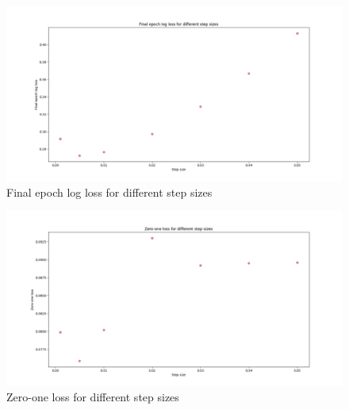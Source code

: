 \documentclass{exam}
\begin{document}
\begin{figure}[!ht]
    \centering
    \includegraphics[width=0.70\paperwidth]{images/plot3.png}
    \caption{Final epoch log loss for different step sizes}
    \label{fig:final-log-loss}
\end{figure}

\begin{figure}[!ht]
    \centering
    \includegraphics[width=0.70\paperwidth]{images/plot2.png}
    \caption{Zero-one loss for different step sizes}
    \label{fig:zero-one-loss}
\end{figure}

\newpage
\end{document}
